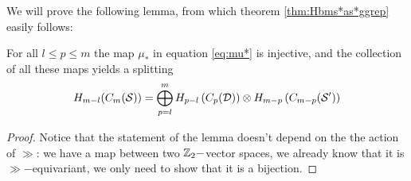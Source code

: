 We will prove the following lemma, from which theorem \ref{thm:Hbms*as*ggrep} easily follows:
\begin{lem}
 \label{lem:oplussplitting}
For all $l\leq p\leq m$ the map $\mu_*$ in equation \ref{eq:mu*} is injective, and the collection
of all these maps yields a splitting
\[
 H_{m-l}(C_m(\mathcal{S}))=\bigoplus_{p=l}^m H_{p-l}\left(C_p(\mathcal{D})\right)\otimes H_{m-p}\left(C_{m-p}(\mathcal{S}')\right)
\]
\end{lem}
\begin{proof}
Notice that the statement of the lemma doesn't depend on the the action of $\gg$:
we have a map between two $\mathbb{Z}_2-$vector spaces, we already know that it is $\gg-$equivariant,
we only need to show that it is a bijection.
% 
% 
% 


\end{proof}
